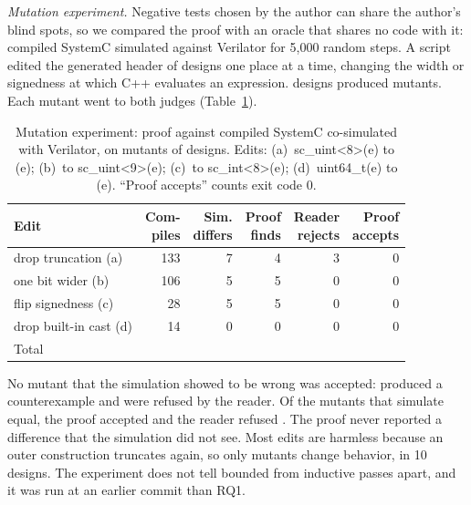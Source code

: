 \documentclass{ieeeaccess}
\newcommand{\code}[1]{{\fontshape{n}\ttfamily #1}}
\begin{document}
\emph{Mutation experiment.} Negative tests chosen by the author can share the author's blind
spots, so we compared the proof with an oracle that shares no code with it: compiled SystemC
simulated against Verilator for 5,000 random steps. A script edited the generated header of
\nMutDesignsGiven{} designs one place at a time, changing the width or signedness at which C++
evaluates an expression. \nMutDesigns{} designs produced mutants. Each mutant went to both judges
(Table~\ref{tab:mut}).

\begin{table}[t]
\centering
\caption{Mutation experiment: proof against compiled SystemC co-simulated with Verilator, on mutants of \nMutDesigns{} designs. Edits: (a)~\code{sc\_uint<8>(e)} to \code{(e)}; (b)~to \code{sc\_uint<9>(e)}; (c)~to \code{sc\_int<8>(e)}; (d)~\code{uint64\_t(e)} to \code{(e)}. ``Proof accepts'' counts exit code 0.}
\label{tab:mut}
\footnotesize
\setlength{\tabcolsep}{2.5pt}
\begin{tabular}{@{}l r r r r r@{}}
\toprule
Edit & \shortstack{Com-\\piles} & \shortstack{Sim.\\differs} & \shortstack{Proof\\finds} & \shortstack{Reader\\rejects} & \shortstack{Proof\\accepts} \\
\midrule
drop truncation (a) & 133 & 7 & 4 & 3 & 0 \\
one bit wider (b) & 106 & 5 & 5 & 0 & 0 \\
flip signedness (c) & 28 & 5 & 5 & 0 & 0 \\
drop built-in cast (d) & 14 & 0 & 0 & 0 & 0 \\
\midrule
Total & \nMutCompiled{} & \nMutSimDiffers{} & \nMutProofFinds{} & \nMutReaderRejects{} & \textbf{\nMutAccepted{}} \\
\bottomrule
\end{tabular}
\end{table}

No mutant that the simulation showed to be wrong was accepted: \nMutProofFinds{} produced a
counterexample and \nMutReaderRejects{} were refused by the reader. Of the \nMutSimEqual{} mutants
that simulate equal, the proof accepted \nMutEqualAccepted{} and the reader refused
\nMutEqualRefused{}. The proof never reported a difference that the simulation did not see. Most
edits are harmless because an outer construction truncates again, so only \nMutSimDiffers{}
mutants change behavior, in 10 designs. The experiment does not tell bounded from inductive passes
apart, and it was run at an earlier commit than RQ1.
\end{document}

